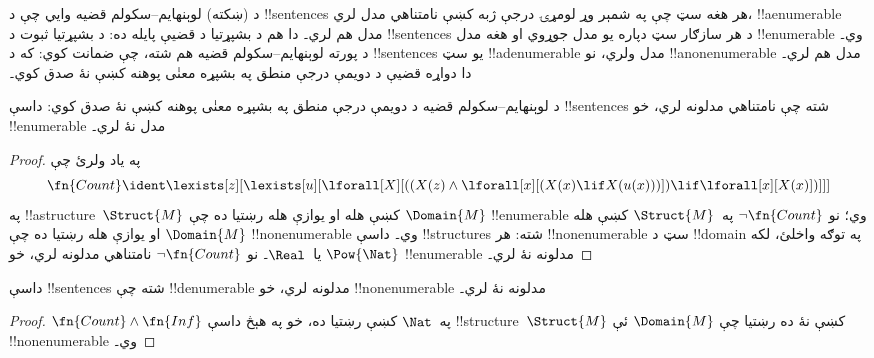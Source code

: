 \documentclass[../../../include/open-logic-section]{subfiles}
\begin{document}


\begin{explain}
د (ښکته) لوېنهايم--سکولم قضيه وايي چې د !!{sentence}s هر هغه سټ
چې په شمېر وړ لومړۍ درجې ژبه کښې نامتناهي مدل لري، !!a{enumerable} مدل هم لري۔ دا هم د بشپړتيا
د قضيې پايله ده: د بشپړتيا ثبوت د !!{sentence}s د هر سازګار سټ
دپاره يو مدل جوړوي او هغه مدل !!{enumerable} وي۔ د پورته
لوېنهايم--سکولم قضيه هم شته، چې ضمانت کوي: که د !!{sentence}s يو سټ
!!a{denumerable} مدل ولري، نو !!a{nonenumerable} مدل هم لري۔ دا دواړه
قضيې د دويمې درجې منطق په بشپړه معنٰی پوهنه کښې نۀ صدق کوي۔
\end{explain}


\begin{thm}
 د لوېنهايم--سکولم قضيه د دويمې درجې منطق
په بشپړه معنٰی پوهنه کښې نۀ صدق کوي: داسې !!{sentence}s شته چې نامتناهي مدلونه لري،
خو !!{enumerable} مدل نۀ لري۔
\end{thm}

\begin{proof}
په ياد ولرئ چې
\[
\fn{Count} \ident \lexists[z][\lexists[u][\lforall[X][((X(z) \land
      \lforall[x][(X(x) \lif X(u(x)))]) \lif \lforall[x][X(x)])]]]
\]
په !!a{structure}~$\Struct{M}$ کښې هله او يوازې هله رښتيا ده چې
$\Domain{M}$ !!{enumerable} وي؛ نو $\lnot\fn{Count}$ په~$\Struct{M}$
کښې هله او يوازې هله رښتيا ده چې $\Domain{M}$ !!{nonenumerable} وي۔
داسې !!{structure}s شته: هر !!{nonenumerable} سټ د !!{domain} په توګه
واخلئ، لکه $\Pow{\Nat}$ يا~$\Real$۔ نو $\lnot \fn{Count}$ نامتناهي
مدلونه لري، خو !!{enumerable} مدلونه نۀ لري۔
\end{proof}

\begin{thm}
داسې !!{sentence}s شته چې !!{denumerable} مدلونه لري، خو
!!{nonenumerable} مدلونه نۀ لري۔
\end{thm}

\begin{proof}
$\fn{Count} \land \fn{Inf}$ په~$\Nat$ کښې رښتيا ده، خو په هېڅ داسې
  !!{structure}~$\Struct{M}$ کښې نۀ ده رښتيا چې $\Domain{M}$ ئې
  !!{nonenumerable} وي۔
\end{proof}
\end{document}
